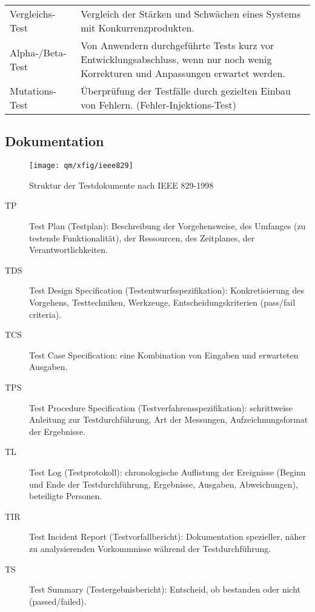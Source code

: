 \newpage
\begin{tabularx}{\linewidth}{l|X}
 Vergleichs-Test & Vergleich der Stärken und Schwächen eines Systems
    mit Konkurrenzprodukten.\\
  Alpha-/Beta-Test & Von Anwendern durchgeführte Tests kurz vor
  Entwicklungsabschluss, wenn nur noch wenig Korrekturen und Anpassungen
  erwartet werden.\\
 Mutations-Test &\"Uberprüfung der Testfälle
  durch gezielten Einbau von Fehlern. (Fehler-Injektions-Test) \\
\end{tabularx}
%
\subsection{Dokumentation}
\begin{figure}[H]
\centering
\texttt{[image: qm/xfig/ieee829]}
\ifslides
\else
\caption{Struktur der Testdokumente nach IEEE 829-1998}
\fi
\end{figure}
\begin{description}
\item[TP] Test Plan (Testplan): Beschreibung der Vorgehensweise, des Umfanges
  (zu testende Funktionalität), der Ressourcen, des Zeitplanes, der
  Verantwortlichkeiten.
\item[TDS] Test Design Specification (Testentwurfsspezifikation):
  Konkretisierung des Vorgehens, Testtechniken, Werkzeuge,
  Entscheidungskriterien (pass/fail criteria).
\item[TCS] Test Case Specification: eine Kombination von Eingaben und
  erwarteten Ausgaben.
\item[TPS] Test Procedure Specification (Testverfahrensspezifikation):
  schrittweise Anleitung zur Testdurchführung, Art der Messungen,
  Aufzeichnungsformat der Ergebnisse.
\ifslides
\newpage
\fi
\item[TL] Test Log (Testprotokoll): chronologische Auflistung der Ereignisse
  (Beginn und Ende der Testdurchführung, Ergebnisse, Ausgaben, Abweichungen),
  beteiligte Personen.
\item[TIR] Test Incident Report (Testvorfallbericht): Dokumentation
  spezieller, näher zu analysierenden Vorkommnisse während der
  Testdurchführung.
\item[TS] Test Summary (Testergebnisbericht): Entscheid, ob bestanden oder
  nicht (passed/failed).
\end{description}
\newpage
